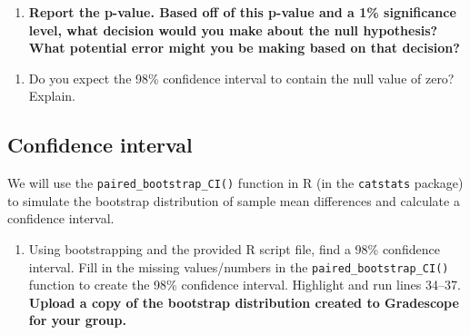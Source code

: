 \documentclass[
]{report}
\newenvironment{Shaded}{\begin{snugshade}}{\end{snugshade}}
\newcommand{\AttributeTok}[1]{\textcolor[rgb]{0.13,0.29,0.53}{#1}}
\newcommand{\CommentTok}[1]{\textcolor[rgb]{0.56,0.35,0.01}{\textit{#1}}}
\newcommand{\DecValTok}[1]{\textcolor[rgb]{0.00,0.00,0.81}{#1}}
\newcommand{\FunctionTok}[1]{\textcolor[rgb]{0.13,0.29,0.53}{\textbf{#1}}}
\newcommand{\NormalTok}[1]{#1}
\newcommand{\SpecialCharTok}[1]{\textcolor[rgb]{0.81,0.36,0.00}{\textbf{#1}}}
\providecommand{\tightlist}{%
  \setlength{\itemsep}{0pt}\setlength{\parskip}{0pt}}
\begin{document}
\begin{enumerate}
\def\labelenumi{\arabic{enumi}.}
\setcounter{enumi}{10}
\tightlist
\item
  \textbf{Report the p-value. Based off of this p-value and a 1\% significance level, what decision would you make about the null hypothesis? What potential error might you be making based on that decision?}
\end{enumerate}

\vspace{0.5in}

\begin{enumerate}
\def\labelenumi{\arabic{enumi}.}
\setcounter{enumi}{11}
\tightlist
\item
  Do you expect the 98\% confidence interval to contain the null value of zero? Explain.
\end{enumerate}

\vspace{0.8in}

\subsection*{Confidence interval}\label{confidence-interval-2}

We will use the \texttt{paired\_bootstrap\_CI()} function in R (in the \texttt{catstats} package) to simulate the bootstrap distribution of sample mean differences and calculate a confidence interval.

\begin{enumerate}
\def\labelenumi{\arabic{enumi}.}
\setcounter{enumi}{12}
\tightlist
\item
  Using bootstrapping and the provided R script file, find a 98\% confidence interval. Fill in the missing values/numbers in the \texttt{paired\_bootstrap\_CI()} function to create the 98\% confidence interval. Highlight and run lines 34--37. \textbf{Upload a copy of the bootstrap distribution created to Gradescope for your group.}
\end{enumerate}

\begin{Shaded}
\end{Shaded}
\end{document}

